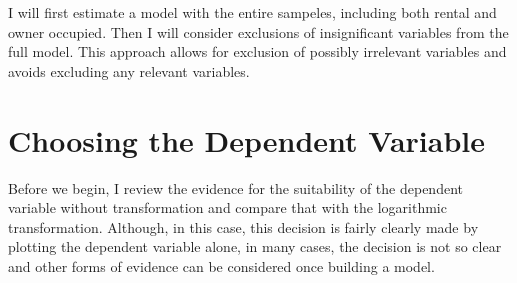 %
%
%
%
%
%
%
%
%
%
%
%
%
%
%
I will first estimate a model with the entire sampeles, including both rental and owner occupied. Then I will consider exclusions of insignificant variables from the full model. 
This approach allows for exclusion of possibly irrelevant variables and avoids excluding any relevant variables. 




\pagebreak
\section{Choosing the Dependent Variable}

Before we begin, I review the evidence for the suitability of the 
dependent variable without transformation
and compare that with the logarithmic transformation. 
Although, in this case, this decision is fairly clearly made by plotting the dependent variable alone, 
in many cases, the decision is not so clear and other forms
of evidence can be considered once building a model. 


